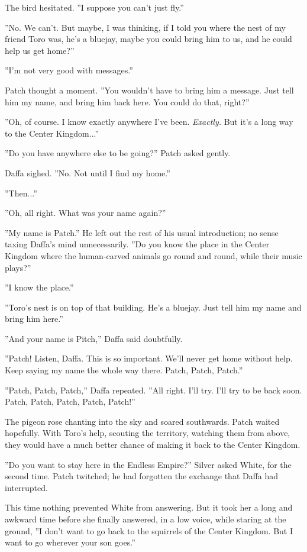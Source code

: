 \documentclass[11pt]{article}
\begin{document}
 The bird hesitated. ''I suppose you can't just fly.''\par
 ''No. We can't. But maybe, I was thinking, if I told you where the nest of my friend Toro was, he's a bluejay, maybe you could bring him to us, and he could help us get home?''\par
 ''I'm not very good with messages.''\par
 Patch thought a moment. ''You wouldn't have to bring him a message. Just tell him my name, and bring him back here. You could do that, right?''\par
 ''Oh, of course. I know exactly anywhere I've been. {\it Exactly.} But it's a long way to the Center Kingdom...''\par
 ''Do you have anywhere else to be going?'' Patch asked gently.\par
 Daffa sighed. ''No. Not until I find my home.''\par
 ''Then...''\par
 ''Oh, all right. What was your name again?''\par
 ''My name is Patch.'' He left out the rest of his usual introduction; no sense taxing Daffa's mind unnecessarily. ''Do you know the place in the Center Kingdom where the human-carved animals go round and round, while their music plays?''\par
 ''I know the place.''\par
''Toro's nest is on top of that building. He's a bluejay. Just tell him my name and bring him here.''\par
''And your name is Pitch,'' Daffa said doubtfully.\par
''Patch! Listen, Daffa. This is so important. We'll never get home without help. Keep saying my name the whole way there. Patch, Patch, Patch.''\par
''Patch, Patch, Patch,'' Daffa repeated. ''All right. I'll try. I'll try to be back soon. Patch, Patch, Patch, Patch, Patch!''\par
The pigeon rose chanting into the sky and soared southwards. Patch waited hopefully. With Toro's help, scouting the territory, watching them from above, they would have a much better chance of making it back to the Center Kingdom.\par
''Do you want to stay here in the Endless Empire?'' Silver asked White, for the second time. Patch twitched; he had forgotten the exchange that Daffa had interrupted.\par
 This time nothing prevented White from answering. But it took her a long and awkward time before she finally answered, in a low voice, while staring at the ground, ''I don't want to go back to the squirrels of the Center Kingdom. But I want to go wherever your son goes.''\par
\end{document}
